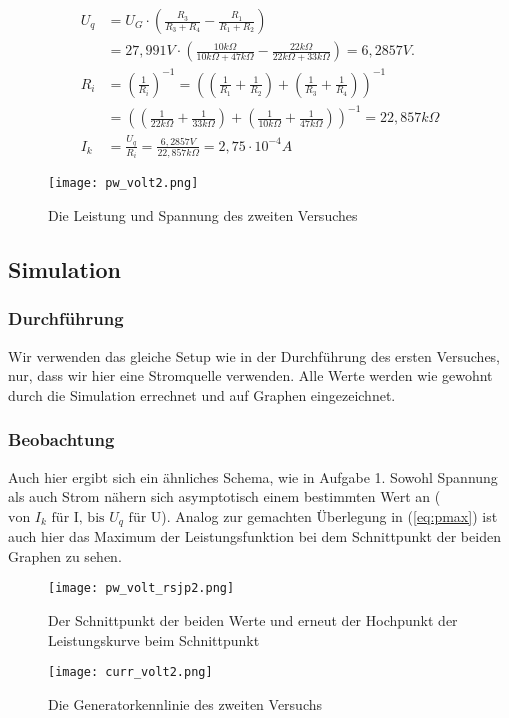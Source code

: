 \documentclass{scrarticle}
\begin{document}
\begin{equation*}
  \begin{aligned}
U_q &= U_G \cdot \left(\frac{R_3}{R_3+R_4} - \frac{R_1}{R_1+R_2}\right) \\
    &= 27,991V \cdot \left(\frac{10k\Omega}{10k\Omega+47k\Omega} - \frac{22k\Omega}{22k\Omega+33k\Omega}\right) = 6,2857V.\\
R_i &= \left(\frac{1}{R_i}\right)^{-1} = \left(\left(\frac{1}{R_1} + \frac{1}{R_2}\right) + \left(\frac{1}{R_3} + \frac{1}{R_4}\right)\right)^{-1} \\
    &= \left(\left(\frac{1}{22k\Omega} + \frac{1}{33k\Omega}\right) + \left(\frac{1}{10k\Omega} + \frac{1}{47k\Omega}\right)\right)^{-1} = 22,857k\Omega\\
I_k &= \frac{U_q}{R_i} = \frac{6,2857V}{22,857k\Omega} = 2,75\cdot 10^{-4}A
  \end{aligned}
\end{equation*}
\begin{figure}[h]
  \begin{center}
  \texttt{[image: pw\_volt2.png]}
  \caption{Die Leistung und Spannung des zweiten Versuches}
  \end{center}
\end{figure}
\newpage
\subsection{Simulation}
\subsubsection{Durchführung}
Wir verwenden das gleiche Setup wie in der Durchführung des ersten Versuches, nur, dass wir hier eine Stromquelle verwenden.
Alle Werte werden wie gewohnt durch die Simulation errechnet und auf Graphen eingezeichnet.
\subsubsection{Beobachtung}

Auch hier ergibt sich ein ähnliches Schema, wie in Aufgabe 1. Sowohl Spannung als auch Strom nähern sich asymptotisch einem bestimmten Wert an ($\text{von }I_k\text{ für I, bis }U_q\text{ für U}$).
Analog zur gemachten Überlegung in (\ref{eq:pmax}) ist auch hier das Maximum der Leistungsfunktion bei dem Schnittpunkt der beiden Graphen zu sehen.
\begin{figure}[h]
  \begin{center}
\texttt{[image: pw\_volt\_rsjp2.png]}
\caption{Der Schnittpunkt der beiden Werte und erneut der Hochpunkt der Leistungskurve beim Schnittpunkt}
  \end{center}
\end{figure}
\begin{figure}
  \begin{center}
    \texttt{[image: curr\_volt2.png]}
    \caption{Die Generatorkennlinie des zweiten Versuchs}
  \end{center}
\end{figure}
\end{document}
